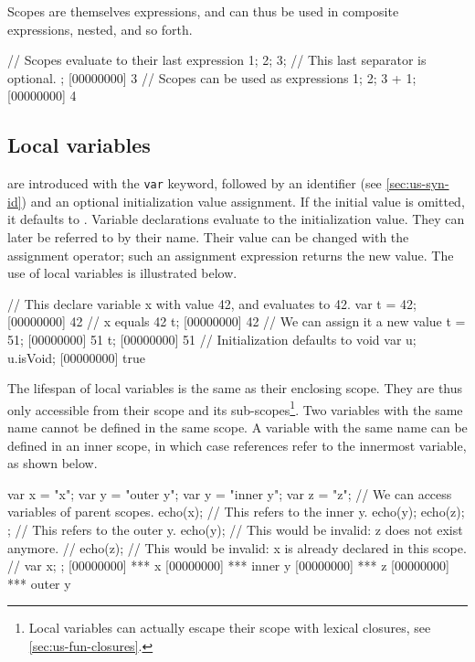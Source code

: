 Scopes are themselves expressions, and can thus be used in composite
expressions, nested, and so forth.

\begin{urbiscript}[firstnumber=last]
// Scopes evaluate to their last expression
{
  1;
  2;
  3; // This last separator is optional.
};
[00000000] 3
// Scopes can be used as expressions
{1; 2; 3} + 1;
[00000000] 4
\end{urbiscript}

\subsection{Local variables}

 are introduced with the \lstinline|var| keyword,
followed by an identifier (see \autoref{sec:us-syn-id}) and an optional
initialization value assignment. If the initial value is omitted, it
defaults to . Variable
declarations evaluate to
the initialization value. They can later be referred to by their
name. Their value can be changed with the assignment operator; such an
assignment expression returns the new value. The use of local
variables is illustrated below.

\begin{urbiscript}[firstnumber=last]
// This declare variable x with value 42, and evaluates to 42.
var t = 42;
[00000000] 42
// x equals 42
t;
[00000000] 42
// We can assign it a new value
t = 51;
[00000000] 51
t;
[00000000] 51
// Initialization defaults to void
var u;
u.isVoid;
[00000000] true
\end{urbiscript}

The lifespan of local variables is the same as their enclosing scope. They
are thus only accessible from their scope and its
sub-scopes\footnote{Local variables can actually escape their scope
  with lexical closures, see \autoref{sec:us-fun-closures}.}. Two
variables with the same name cannot be defined in the same scope. A
variable with the same name can be defined in an inner scope, in which
case references refer to the innermost variable, as shown below.

\begin{urbiscript}[firstnumber=last]
{
  var x = "x";
  var y = "outer y";
  {
    var y = "inner y";
    var z = "z";
    // We can access variables of parent scopes.
    echo(x);
    // This refers to the inner y.
    echo(y);
    echo(z);
  };
  // This refers to the outer y.
  echo(y);
  // This would be invalid: z does not exist anymore.
  // echo(z);
  // This would be invalid: x is already declared in this scope.
  // var x;
};
[00000000] *** x
[00000000] *** inner y
[00000000] *** z
[00000000] *** outer y
\end{urbiscript}


